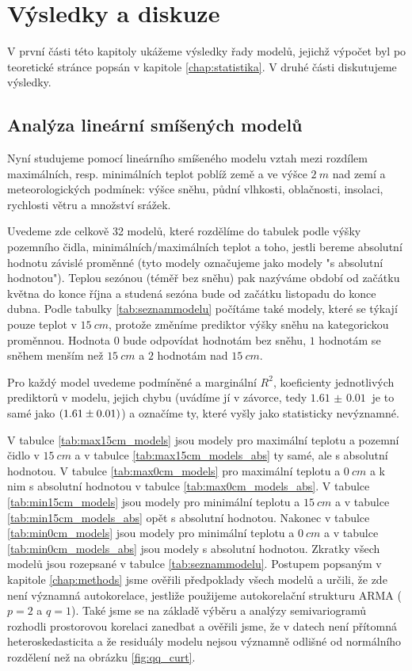 \chapter{Výsledky a diskuze}\label{chap:ch3}
V první části této kapitoly ukážeme výsledky řady modelů, jejichž výpočet byl po teoretické stránce popsán v kapitole \ref{chap:statistika}. V druhé části diskutujeme výsledky.

\section{Analýza lineární smíšených modelů}
Nyní studujeme pomocí lineárního smíšeného modelu vztah mezi rozdílem maximálních, resp. minimálních teplot poblíž země a ve výšce $\SI{2}{m}$ nad zemí a meteorologických podmínek: výšce sněhu, půdní vlhkosti, oblačnosti, insolaci, rychlosti větru a množství srážek.

Uvedeme zde celkově 32 modelů, které rozdělíme do tabulek podle výšky pozemního čidla, minimálních/maximálních teplot a toho, jestli bereme absolutní hodnotu závislé proměnné (tyto modely označujeme jako modely "s absolutní hodnotou"). Teplou sezónou (téměř bez sněhu) pak nazýváme období od začátku května do konce října a studená sezóna bude od začátku listopadu do konce dubna. Podle tabulky \ref{tab:seznammodelu} počítáme také modely, které se týkají pouze teplot v $\SI{15}{cm}$, protože změníme prediktor výšky sněhu na kategorickou proměnnou. Hodnota $0$ bude odpovídat hodnotám bez sněhu, $1$ hodnotám se sněhem menším než $\SI{15}{cm}$ a $2$ hodnotám nad $\SI{15}{cm}$.

Pro každý model uvedeme podmíněné a marginální $R^2$, koeficienty jednotlivých prediktorů v modelu, jejich chybu (uvádíme jí v závorce, tedy $\SI{1.61(1)}{}$ je to samé jako $\SI[separate-uncertainty = true]{1.61\pm 0.01}{}$) a označíme ty, které vyšly jako statisticky nevýznamné.

V tabulce \ref{tab:max15cm_models} jsou modely pro maximální teplotu a pozemní čidlo v $\SI{15}{cm}$ a v tabulce \ref{tab:max15cm_models_abs} ty samé, ale s absolutní hodnotou. V tabulce \ref{tab:max0cm_models} pro maximální teplotu a $\SI{0}{cm}$ a k nim s absolutní hodnotou v tabulce \ref{tab:max0cm_models_abs}. V tabulce \ref{tab:min15cm_models} jsou modely pro minimální teplotu a $\SI{15}{cm}$ a v tabulce \ref{tab:min15cm_models_abs} opět s absolutní hodnotou. Nakonec v tabulce \ref{tab:min0cm_models} jsou modely pro minimální teplotu a $\SI{0}{cm}$ a v tabulce \ref{tab:min0cm_models_abs} jsou modely s absolutní hodnotou. Zkratky všech modelů jsou rozepsané v tabulce \ref{tab:seznammodelu}. Postupem popsaným v kapitole \ref{chap:methods} jsme ověřili předpoklady všech modelů a určili, že zde není významná autokorelace, jestliže použijeme autokorelační strukturu ARMA ($p=2$ a $q=1$). Také jsme se na základě výběru a analýzy semivariogramů rozhodli prostorovou korelaci zanedbat a ověřili jsme, že v datech není přítomná heteroskedasticita a že residuály modelu nejsou významně odlišné od normálního rozdělení než na obrázku \ref{fig:qq_curt}.

